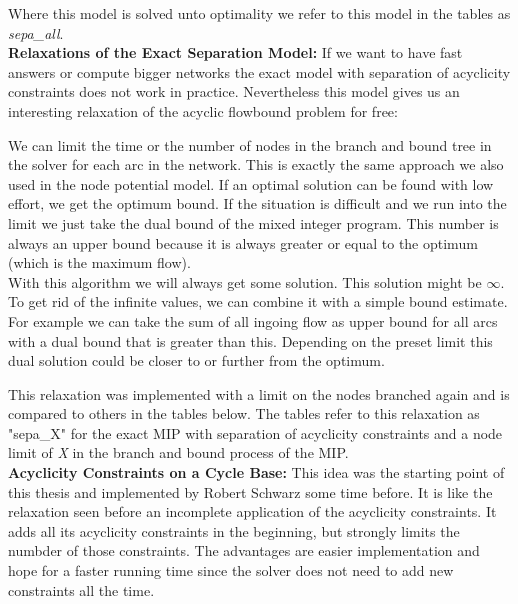 Where this model is solved unto optimality we refer to this model in the tables as \textit{sepa\_all}.\\


\textbf{Relaxations of the Exact Separation Model: }
If we want to have fast answers or compute bigger networks the exact model with separation of acyclicity 
constraints does not work in practice. Nevertheless this model gives us an interesting relaxation of the acyclic 
flowbound problem for free: 

We can limit the time or the number of nodes in the branch and bound tree in the solver for each arc in the network. 
This is exactly the same approach we also used in the node potential model. If an optimal solution can be found with low 
effort, we get the optimum bound. If the situation is difficult and we run into the limit 
we just take the dual bound of the mixed integer program. This number is always an upper bound because it is always 
greater or equal to the optimum (which is the maximum flow). \\

With this algorithm we will always get some solution. This solution might be $\infty$. To get rid of the infinite 
values, we can combine it with a simple bound estimate. For example we can take the sum of all ingoing flow as upper 
bound for all arcs with a dual bound that is greater than this. Depending on the preset limit this dual solution could
be closer to or further from the optimum. 

This relaxation was implemented with a limit on the nodes branched again and is compared to 
others in the tables below. The tables refer to this relaxation as "sepa\_X" for the exact MIP with separation of 
acyclicity constraints and a node limit of \textit{X} in the branch and bound process of the MIP.\\

\textbf{Acyclicity Constraints on a Cycle Base: }
This idea was the starting point of this thesis and implemented by Robert Schwarz some time before. It is like the 
relaxation seen before an incomplete application of the acyclicity constraints. It adds all its acyclicity constraints 
in the beginning, but strongly limits the numbder of those constraints. The advantages are easier implementation and 
hope for a faster running time since the solver does not need to add new constraints all the time.

